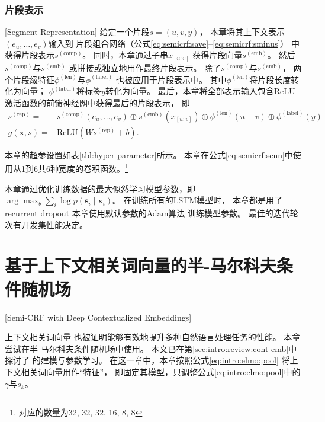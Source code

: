\subsubsection{片段表示}[Segment Representation]
给定一个片段$s=(u, v, y)$，
本章将其上下文表示$(e_u, \dots, e_v)$输入到
片段组合网络（公式\ref{eq:semicrf:save}--\ref{eq:semicrf:sminus}）
中获得片段表示$s^{(\text{comp})}$。
同时，本章通过子串$x_{[u: v]}$
获得片段向量$s^{(\text{emb})}$。
然后$s^{(\text{comp})}$与$s^{(\text{emb})}$
或拼接或独立地用作最终片段表示。
除了$s^{(\text{comp})}$与$s^{(\text{emb})}$，
两个片段级特征$\phi^{(\text{len})}$与$\phi^{(\text{label})}$
也被应用于片段表示中。
其中$\phi^{(\text{len})}$将片段长度转化为向量；
$\phi^{(\text{label})}$将标签$y$转化为向量。
最后，本章将全部表示输入包含ReLU激活函数的前馈神经网中获得最后的片段表示，
即
\begin{align*}
s^{(\text{rep})} =& s^{(\text{comp})}(e_u, \dots, e_v) \oplus s^{(\text{emb})}(x_{[u:v]}) \oplus \phi^{(\text{len})}(u - v) \oplus \phi^{(\text{label})}(y) \\
g(\mathbf{x}, s) =& \text{ReLU}(W s^{(\text{rep})} + b).
\end{align*}

本章的超参设置如表\ref{tbl:hyper-parameter}所示。
本章在公式\ref{eq:semicrf:scnn}中使用从1到6共6种宽度的卷积函数。\footnote{对应的数量为32, 32, 32, 16, 8, 8}

本章通过优化训练数据的最大似然学习模型参数，即
$
\arg\max_\theta \sum_i \log p(\mathbf{s}_i \mid \mathbf{x}_i )\text{。}
$
在训练所有的LSTM模型时，
本章都是用了recurrent dropout \cite{Gal:2016:TGA:3157096.3157211}
本章使用默认参数的Adam算法\cite{DBLP:journals/corr/KingmaB14}
训练模型参数。
最佳的迭代轮次有开发集性能决定。

\section{基于上下文相关词向量的半-马尔科夫条件随机场}[Semi-CRF with Deep Contextualized Embeddings]\label{sec:semicrf:cove}

上下文相关词向量\cite{NIPS2017_7209,peters-EtAl:2018:N18-1,P18-1031,gpt1,DBLP:journals/corr/abs-1810-04805}
也被证明能够有效地提升多种自然语言处理任务的性能。
本章尝试在半-马尔科夫条件随机场中使用\elmochinesetranslation。
本文已在第\ref{sec:intro:review:cont-emb}中
探讨了\elmochinesetranslation
的建模与参数学习。
在这一章中，本章按照公式\ref{eq:intro:elmo:pool}
将上下文相关词向量用作``特征''，
即固定其模型，只调整公式\ref{eq:intro:elmo:pool}中的$\gamma$与$s_k$。

